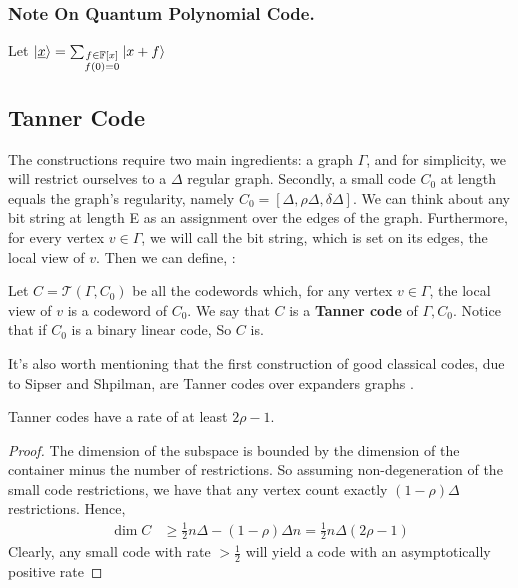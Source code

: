 \subsubsection{Note On Quantum Polynomial Code.} 
Let $\ket{\underline{x}} = \sum_{ \substack{ f \in \mathbb{F}[x] \\  f(0) = 0}}{ \ket{ x + f}} $

  \subsection{Tanner Code}
  The constructions require two main ingredients: a graph $\Gamma$, and for simplicity, we will restrict ourselves to a $\Delta$ regular graph. Secondly, a small code $C_{0}$ at length equals the graph's regularity, namely $C_{0} = [\Delta,\rho\Delta, \delta\Delta]$. We can think about any bit string at length E as an assignment over the edges of the graph. Furthermore, for every vertex $v \in \Gamma$, we will call the bit string, which is set on its edges, the local view of $v$. Then we can define, \cite{Tanner}:
  \begin{definition}  Let $ C = \mathcal{T}\left( \Gamma, C_{0} \right)$  be all the codewords which, for any vertex $v\in \Gamma$, the local view of $v$ is a codeword of $C_{0}$. We say that $C$ is a \textbf{Tanner code}\label{Tan} of $\Gamma, C_{0}$. Notice that if $C_{0}$ is a binary linear code, So $C$ is.  
  \end{definition}

  It's also worth mentioning that the first construction of good classical codes, due to Sipser and Shpilman, are Tanner codes over expanders graphs \cite{ExpanderCodes}.
  \begin{theorem*}  Tanner codes have a rate of at least $2\rho - 1$. \end{theorem*}
  \begin{proof}  The dimension of the subspace is bounded by the dimension of the container minus the number of restrictions. So assuming non-degeneration of the small code restrictions, we have that any vertex count exactly $ \left( 1 - \rho  \right)\Delta $ restrictions. Hence, \begin{equation*}
    \begin{split}
      \dim C & \ge \frac{1}{2}n\Delta - \left( 1-\rho \right)\Delta n = \frac{1}{2}n\Delta\left( 2\rho - 1 \right)  
    \end{split}
  \end{equation*} Clearly, any small code with rate $> \frac{1}{2}$ will yield a code with an asymptotically positive rate \end{proof} 
